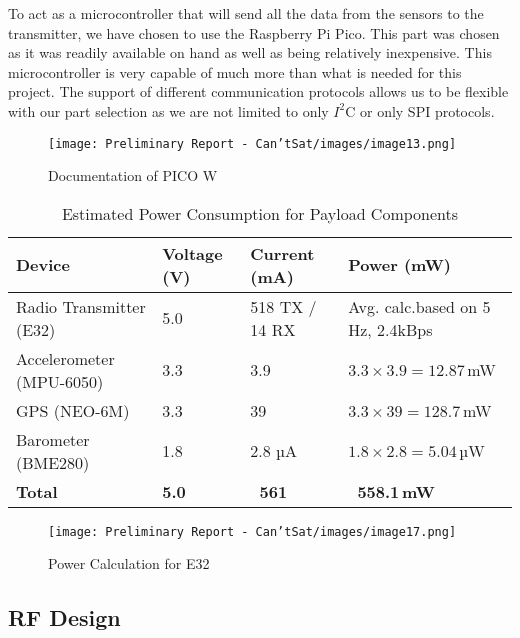\documentclass[10pt,twocolumn]{article}
\begin{document}
To act as a microcontroller that will send all the data from the sensors to the transmitter, we have chosen to use the Raspberry Pi Pico. This part was chosen as it was readily available on hand as well as being relatively inexpensive. This microcontroller is very capable of much more than what is needed for this project. The support of different communication protocols allows us to be flexible with our part selection as we are not limited to only $I^2$C or only SPI protocols.

\begin{figure}[H]
\centering
\texttt{[image: Preliminary Report - Can'tSat/images/image13.png]}  
\caption{\label{fig:PICo} Documentation of PICO W}
\end{figure}

\begin{table}[htbp]
\footnotesize
\centering
\begin{tabular}{|p{2.0cm}|p{1cm}|p{1.5cm}|p{3cm}|}
\hline
\rowcolor{gray!30}
\textbf{Device} & \textbf{Voltage (V)} & \textbf{Current (mA)} & \textbf{Power (mW)} \\
\hline
Radio Transmitter (E32) & 5.0 & 518 TX / 14 RX & Avg. calc.\footnotemark[1] based on 5 Hz, 2.4kBps \\
\hline
Accelerometer (MPU-6050) & 3.3 & 3.9 & $3.3 \times 3.9 = 12.87$\,mW \\
\hline
GPS (NEO-6M) & 3.3 & 39 & $3.3 \times 39 = 128.7$\,mW \\
\hline
Barometer (BME280) & 1.8 & 2.8 µA & $1.8 \times 2.8 = 5.04$\,µW \\
\hline
\rowcolor{yellow!40}
\textbf{Total} & \textbf{5.0} & \textbf{~561} & \textbf{~558.1\,mW} \\
\hline
\end{tabular}
\caption{Estimated Power Consumption for Payload Components}
\label{tab:powerbudget}
\end{table}



\begin{figure}[H]
\centering
\texttt{[image: Preliminary Report - Can'tSat/images/image17.png]}  
\caption{\label{fig:RadioCalc} Power Calculation for E32}
\end{figure}


\subsection{\textbf{RF Design}}
\end{document}
